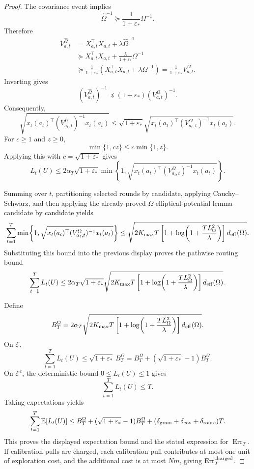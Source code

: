 \documentclass{article} %
\begin{document}
\begin{proof}
The covariance event implies
\[
\widehat\Omega^{-1}\succeq \frac{1}{1+\varepsilon_*}\Omega^{-1}.
\]
Therefore
\[
\begin{aligned}
V_{a,t}^{\widehat\Omega}
&=
X_{a,t}^\top X_{a,t}+\lambda\widehat\Omega^{-1}
\\
&\succeq
X_{a,t}^\top X_{a,t}
+
\frac{\lambda}{1+\varepsilon_*}\Omega^{-1}
\\
&\succeq
\frac{1}{1+\varepsilon_*}
\left(
X_{a,t}^\top X_{a,t}+\lambda\Omega^{-1}
\right)
=
\frac{1}{1+\varepsilon_*}V_{a,t}^{\Omega}.
\end{aligned}
\]
Inverting gives
\[
(V_{a,t}^{\widehat\Omega})^{-1}
\preceq
(1+\varepsilon_*)(V_{a,t}^{\Omega})^{-1}.
\]
Consequently,
\[
\sqrt{
x_t(a_t)^\top
(V_{a_t,t}^{\widehat\Omega})^{-1}
x_t(a_t)
}
\le
\sqrt{1+\varepsilon_*}
\sqrt{
x_t(a_t)^\top
(V_{a_t,t}^{\Omega})^{-1}
x_t(a_t)
}.
\]
For \(c\ge1\) and \(z\ge0\),
\[
\min\{1,cz\}\le c\min\{1,z\}.
\]
Applying this with \(c=\sqrt{1+\varepsilon_*}\) gives
\[
L_t(U)
\le
2\alpha_T\sqrt{1+\varepsilon_*}
\min\!\left\{
1,
\sqrt{
x_t(a_t)^\top
(V_{a_t,t}^{\Omega})^{-1}
x_t(a_t)
}
\right\}.
\]

Summing over \(t\), partitioning selected rounds by candidate, applying
Cauchy--Schwarz, and then applying the already-proved
\(\Omega\)-elliptical-potential lemma candidate by candidate yields
\[
\sum_{t=1}^T
\min\!\left\{
1,
\sqrt{
x_t(a_t)^\top
(V_{a_t,t}^{\Omega})^{-1}
x_t(a_t)
}
\right\}
\le
\sqrt{
2K_{\max}T
\left[
1+\log\!\left(1+\frac{TL_\Omega^2}{\lambda}\right)
\right]
d_{\rm eff}(\Omega)
}.
\]
Substituting this bound into the previous display proves the pathwise routing
bound
\[
\sum_{t=1}^T L_t(U)
\le
2\alpha_T\sqrt{1+\varepsilon_*}
\sqrt{
2K_{\max}T
\left[
1+\log\!\left(1+\frac{TL_\Omega^2}{\lambda}\right)
\right]
d_{\rm eff}(\Omega)
}.
\]

Define
\[
B_T^\Omega
=
2\alpha_T
\sqrt{
2K_{\max}T
\left[
1+\log\!\left(1+\frac{TL_\Omega^2}{\lambda}\right)
\right]
d_{\rm eff}(\Omega)
}.
\]
On \(\mathcal{E}\),
\[
\sum_{t=1}^T L_t(U)
\le
\sqrt{1+\varepsilon_*}\,B_T^\Omega
=
B_T^\Omega+
(\sqrt{1+\varepsilon_*}-1)B_T^\Omega.
\]
On \(\mathcal{E}^c\), the deterministic bound \(0\le L_t(U)\le1\) gives
\[
\sum_{t=1}^T L_t(U)\le T.
\]
Taking expectations yields
\[
\sum_{t=1}^T\mathbb{E}[L_t(U)]
\le
B_T^\Omega+
(\sqrt{1+\varepsilon_*}-1)B_T^\Omega
+
(\delta_{\rm gram}+\delta_{\rm cov}+\delta_{\rm route})T.
\]
This proves the displayed expectation bound and the stated expression for
\(\operatorname{Err}_T\).  If calibration pulls are charged, each calibration
pull contributes at most one unit of exploration cost, and the additional cost
is at most \(Nm\), giving \(\operatorname{Err}_T^{\rm charged}\).


\end{proof}
\end{document}
